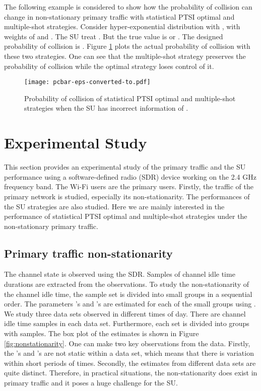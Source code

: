 \documentclass[10pt,final,journal,letterpaper]{IEEEtran}
\begin{document}
\par
The following example is considered to show how the probability of collision can change in non-stationary primary traffic with statistical PTSI optimal and multiple-shot strategies. Consider hyper-exponential distribution with ,  with weights of  and . The SU treat . But the true value is  or . The designed probability of collision is . Figure \ref{fig:pcbar} plots the actual probability of collision with these two strategies. One can see that the multiple-shot strategy preserves the probability of collision while the optimal strategy loses control of it.
\begin{figure}[!h]
\centering
\texttt{[image: pcbar-eps-converted-to.pdf]}
\caption{Probability of collision of statistical PTSI optimal and multiple-shot strategies when the SU has incorrect information of .}
\label{fig:pcbar}
\end{figure}

\section{Experimental Study}\label{sec:6}
This section provides an experimental study of the primary traffic and the SU performance using a software-defined radio (SDR) device working on the 2.4 GHz frequency band. The Wi-Fi users are the primary users. Firstly, the traffic of the primary network is studied, especially its non-stationarity. The performances of the SU strategies are also studied. Here we are mainly interested in the performance of statistical PTSI optimal and multiple-shot strategies under the non-stationary primary traffic.

\subsection{Primary traffic non-stationarity}
The channel state is observed using the SDR. Samples of channel idle time durations are extracted from the observations. To study the non-stationarity of the channel idle time, the sample set is divided into small groups in a sequential order. The parameters 's and 's are estimated for each of the small groups using . We study three data sets observed in different times of day. There are  channel idle time samples in each data set. Furthermore, each set is divided into groups with  samples. The box plot of the estimates is shown in Figure \ref{fig:nonstationarity}. One can make two key observations from the data. Firstly, the 's and 's are not static within a data set, which means that there is variation within short periods of times. Secondly, the estimates from different data sets are quite distinct. Therefore, in practical situations, the non-stationarity does exist in primary traffic and it poses a huge challenge for the SU.
\begin{figure*}[!t]
  \centering
  \caption{Box plot of statistics of the parameter estimates in hyper-exponential distribution.}
  \label{fig:nonstationarity}
\end{figure*}
\end{document}
